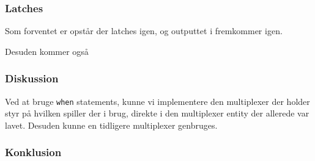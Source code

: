 {\subsubsection*{Latches}

Som forventet er opstår der latches igen, og outputtet i  fremkommer igen. 

Desuden kommer også 


\subsubsection{Diskussion}
Ved at bruge \texttt{when} statements, kunne vi implementere den multiplexer der holder styr på hvilken spiller der i brug, direkte i den multiplexer entity der allerede var lavet. Desuden kunne en tidligere multiplexer genbruges.
\subsubsection{Konklusion}}
